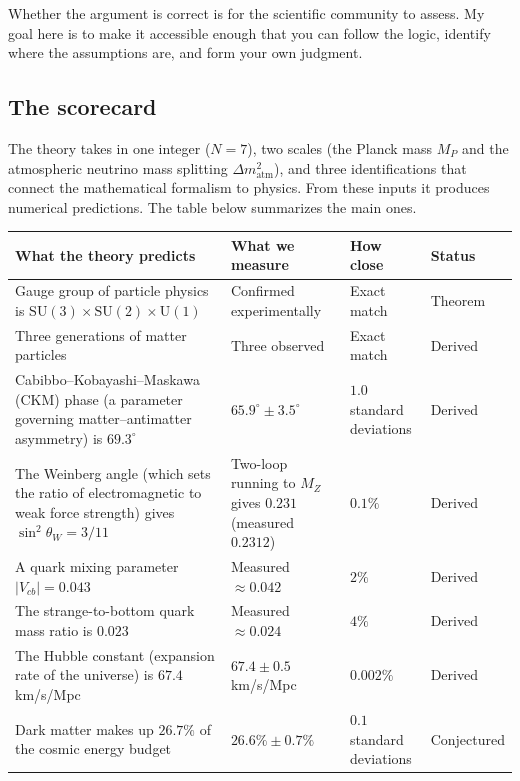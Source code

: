 Whether the argument is correct is for the scientific community to
assess. My goal here is to make it accessible enough that you can
follow the logic, identify where the assumptions are, and form your
own judgment.


\subsection*{The scorecard}

The theory takes in one integer ($N = 7$), two scales (the Planck
mass $M_P$ and the atmospheric neutrino mass splitting
$\Delta m^2_{\mathrm{atm}}$), and three identifications
that connect the mathematical formalism to physics. From these
inputs it produces numerical predictions. The table below summarizes
the main ones.

\begin{center}
\small
\renewcommand{\arraystretch}{1.25}
\begin{tabular}{p{5.2cm} p{3.5cm} p{2cm} l}
\toprule
\textbf{What the theory predicts} & \textbf{What we measure} & \textbf{How close} & \textbf{Status} \\
\midrule
Gauge group of particle physics is $\mathrm{SU}(3) \times \mathrm{SU}(2) \times \mathrm{U}(1)$
  & Confirmed experimentally & Exact match & Theorem \\[4pt]
Three generations of matter particles
  & Three observed & Exact match & Derived \\[4pt]
Cabibbo--Kobayashi--Maskawa (CKM) phase (a parameter governing matter--antimatter asymmetry) is $69.3^\circ$
  & $65.9^\circ \pm 3.5^\circ$ & $1.0$ standard deviations & Derived \\[4pt]
The Weinberg angle (which sets the ratio of electromagnetic to weak force strength) gives $\sin^2\theta_W = 3/11$
  & Two-loop running to $M_Z$ gives $0.231$ (measured $0.2312$) & $0.1\%$ & Derived \\[4pt]
A quark mixing parameter $|V_{cb}| = 0.043$
  & Measured $\approx 0.042$ & $2\%$ & Derived \\[4pt]
The strange-to-bottom quark mass ratio is $0.023$
  & Measured $\approx 0.024$ & $4\%$ & Derived \\[4pt]
The Hubble constant (expansion rate of the universe) is $67.4$ km/s/Mpc
  & $67.4 \pm 0.5$ km/s/Mpc & $0.002\%$ & Derived \\[4pt]
Dark matter makes up $26.7\%$ of the cosmic energy budget
  & $26.6\% \pm 0.7\%$ & $0.1$ standard deviations & Conjectured \\[4pt]

\end{tabular}
\end{center}
